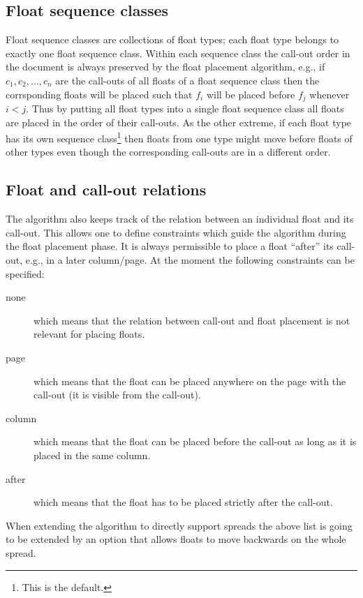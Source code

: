 \documentclass[twocolumn]{article}
\begin{document}
\subsection{Float sequence classes}

Float sequence classes are collections of float types; each float type
belongs to exactly one float sequence class. Within each sequence
class the call-out order in the document is always preserved by the
float placement algorithm, e.g., if $c_1,c_2,\ldots,c_n$ are the
call-outs of all floats of a float sequence class then the
corrsponding floats will be placed such that $f_i$ will be placed
before $f_j$ whenever $i<j$.  Thus by putting all float types into a
single float sequence class all floats are placed in the order of
their call-outs. As the other extreme, if each float type has its own
sequence class\footnote{This is the \LaTeXe{} default.} then floats
from one type might move before floats of other types even though the
corresponding call-outs are in a different order.



\subsection{Float and call-out relations} \label{fl-callout-relations}

The algorithm also keeps track of the relation between an individual
float and its call-out. This allows one to define constraints which
guide the algorithm during the float placement phase. It is always
permissible to place a float ``after'' its call-out, e.g., in a later
column/\allowbreak page. At the moment the following constraints can
be specified:
\begin{description}
\item[none] which means that the relation between call-out and float
placement is not relevant for placing floats.
\item[page] which means that the float can be placed anywhere on the
page with the call-out (it is visible from the call-out).
\item[column] which means that the float can be placed before the
call-out as long as it is placed in the same column.
\item[after] which means that the float has to be placed strictly
after the call-out.
\end{description}
When extending the algorithm to directly support spreads the
above list is going to be extended by an option that allows floats to
move backwards on the whole spread.
\end{document}
